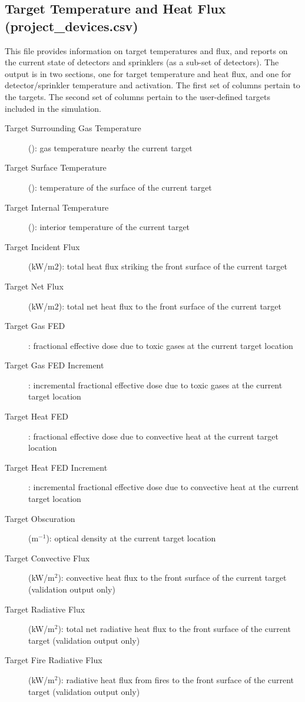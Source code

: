 \subsection{Target Temperature and Heat Flux (project\_devices.csv)}

This file provides information on target temperatures and flux, and reports on the current state of detectors and sprinklers (as a sub-set of detectors). The output is in two sections, one for target temperature and heat flux, and one for detector/sprinkler temperature and activation. The first set of columns pertain to the targets.
The second set of columns pertain to the user-defined targets included in the simulation.
\begin{description}
\item[Target Surrounding Gas Temperature] (\degc): gas temperature nearby the current target
\item[Target Surface Temperature] (\degc): temperature of the surface of the current target
\item[Target Internal Temperature] (\degc): interior temperature of the current target
\item[Target Incident Flux] (kW/m$2$): total heat flux striking the front surface of the current target
\item[Target Net Flux] (kW/m$2$): total net heat flux to the front surface of the current target
\item[Target Gas FED]: fractional effective dose due to toxic gases at the current target location
\item[Target Gas FED Increment]: incremental fractional effective dose due to toxic gases at the current target location
\item[Target Heat FED]: fractional effective dose due to convective heat at the current target location
\item[Target Heat FED Increment]: incremental fractional effective dose due to convective heat at the current target location
\item[Target Obscuration] (m$^{-1}$):  optical density at the current target location
\item[Target Convective Flux] (kW/m$^2$): convective heat flux to the  front surface of the current target (validation output only)
\item[Target Radiative Flux] (kW/m$^2$): total net radiative heat flux to the front surface of the current target (validation output only)
\item[Target Fire Radiative Flux] (kW/m$^2$): radiative heat flux from fires to the front surface of the current target (validation output only)

\end{description}
